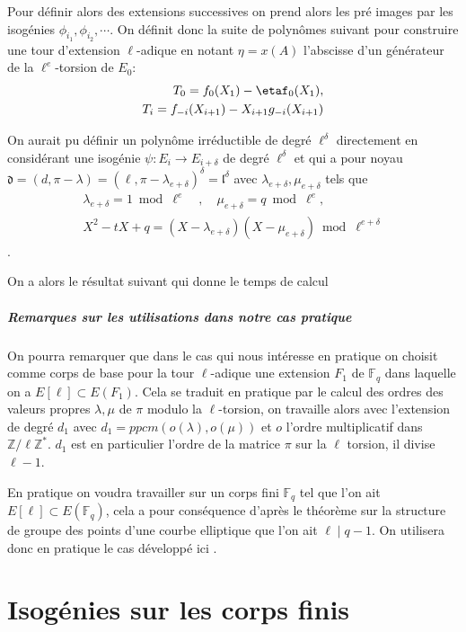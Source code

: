 \documentclass[10pt,a4paper]{book}
\theoremstyle{plain}
\theoremstyle{definition}
\theoremstyle{definition}
\theoremstyle{definition}
\theoremstyle{definition}
\theoremstyle{remark}
\theoremstyle{remark}
\begin{document}
Pour définir alors des extensions successives on prend alors les pré images par les isogénies $\phi_{i_1},\phi_{i_2}, \cdots$. On définit donc la suite de polynômes suivant pour construire une tour d'extension $\ell$-adique en notant $\eta =x(A)$ l'abscisse d'un générateur de la $\ell^e$-torsion de $E_0$:
\begin{align*}
T_0=f_0(X_1)-\etaf_0(X_1), \\
T_i=f_{-i}(X_{i+1})-X_{i+1}g_{-i}(X_{i+1})
\end{align*}

On aurait pu définir un polynôme irréductible de degré $\ell^{\delta}$ directement en considérant une isogénie $\psi:E_i \to E_{i+\delta}$ de degré $\ell^{\delta}$ et qui a pour noyau $\mathfrak{d}=(d,\pi-\lambda)=(\ell,\pi-\lambda_{e+\delta})^{\delta}=\mathfrak{l}^{\delta}$ avec $\lambda_{e+\delta}, \mu_{e+\delta}$ tels que 
\begin{align*}
\lambda_{e+\delta}=1 \bmod \ell^{e} \quad , \quad \mu_{e+\delta}=q \bmod \ell^e, \\
X^2-tX+q = (X-\lambda_{e+\delta})(X-\mu_{e+\delta}) \bmod \ell^{e+\delta} 
\end{align*}.

On a alors le résultat suivant qui donne le temps de calcul 


\paragraph{Remarques sur les utilisations dans notre cas pratique}
On pourra remarquer que dans le cas qui nous intéresse en pratique on choisit comme corps de base pour la tour $\ell$-adique une extension $F_1$ de $\mathbb{F}_q$ dans laquelle on a $E[\ell] \subset E(F_1)$. Cela se traduit en pratique par le calcul des ordres des valeurs propres $\lambda, \mu$ de $\pi$ modulo la $\ell$-torsion, on travaille alors avec l'extension de degré $d_1$ avec $d_1=ppcm(o(\lambda),o(\mu))$ et $o$ l'ordre multiplicatif dans $\mathbb{Z}/\ell\mathbb{Z}^*$. $d_1$ est en particulier l'ordre de la matrice $\pi$ sur la $\ell$ torsion, il divise $\ell-1$.  

En pratique on voudra travailler sur un corps fini $\mathbb{F}_q$ tel que l'on ait $E[\ell] \subset E(\mathbb{F}_q)$, cela a pour conséquence d'après le théorème sur la structure de groupe des points d'une courbe elliptique que l'on ait $\ell \mid q-1$. On utilisera donc en pratique le cas développé ici .

\chapter{Isogénies sur les corps finis}
\end{document}
